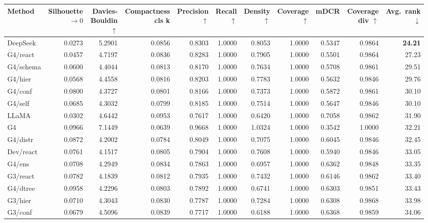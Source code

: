 \begin{table}[t]
\centering
\scriptsize
\setlength\tabcolsep{3pt}
\begin{tabular}{lrrrrrrrrrr}
\toprule
\textbf{Method} & \textbf{Silhouette} $\rightarrow 0$ & \textbf{Davies-Bouldin} $\uparrow$ & \textbf{Compactness cls k}  & \textbf{Precision} $\uparrow$ & \textbf{Recall} $\uparrow$ & \textbf{Density} $\uparrow$ & \textbf{Coverage} $\uparrow$ & \textbf{mDCR}  & \textbf{Coverage div} $\uparrow$ & \textbf{Avg.\ rank} $\downarrow$ \\
\midrule
DeepSeek & 0.0273 & 5.2901 & 0.0856 & 0.8303 & 1.0000 & 0.8053 & 1.0000 & 0.5347 & 0.9864 & \textbf{24.21} \\
\midrule
G4/react & 0.0457 & 4.7197 & 0.0836 & 0.8283 & 1.0000 & 0.7905 & 1.0000 & 0.5501 & 0.9864 & 27.23 \\
G4/schema & 0.0600 & 4.4044 & 0.0813 & 0.8170 & 1.0000 & 0.7634 & 1.0000 & 0.5708 & 0.9861 & 29.51 \\
G4/hier & 0.0568 & 4.4558 & 0.0816 & 0.8203 & 1.0000 & 0.7783 & 1.0000 & 0.5632 & 0.9846 & 29.76 \\
G4/conf & 0.0800 & 4.3727 & 0.0801 & 0.8166 & 1.0000 & 0.7373 & 1.0000 & 0.5872 & 0.9861 & 30.10 \\
G4/self & 0.0685 & 4.3032 & 0.0799 & 0.8185 & 1.0000 & 0.7514 & 1.0000 & 0.5647 & 0.9846 & 30.10 \\
\midrule
LLaMA & 0.0302 & 4.6442 & 0.0953 & 0.7617 & 1.0000 & 0.6420 & 1.0000 & 0.7058 & 0.9862 & 31.90 \\
\midrule
G4 & 0.0966 & 7.1449 & 0.0639 & 0.9668 & 1.0000 & 1.0324 & 1.0000 & 0.3542 & 1.0000 & 32.21 \\
G4/distr & 0.0872 & 4.2002 & 0.0784 & 0.8049 & 1.0000 & 0.7075 & 1.0000 & 0.6045 & 0.9846 & 32.45 \\
Dev/react & 0.0761 & 4.1517 & 0.0805 & 0.7904 & 1.0000 & 0.7608 & 1.0000 & 0.5940 & 0.9846 & 33.05 \\
G4/ens & 0.0708 & 4.2949 & 0.0834 & 0.7863 & 1.0000 & 0.6957 & 1.0000 & 0.6362 & 0.9848 & 33.35 \\
G3/react & 0.0782 & 4.1839 & 0.0812 & 0.7935 & 1.0000 & 0.7432 & 1.0000 & 0.6146 & 0.9862 & 33.40 \\
G4/dtree & 0.0958 & 4.2296 & 0.0803 & 0.7892 & 1.0000 & 0.6741 & 1.0000 & 0.6303 & 0.9851 & 33.43 \\
G3/hier & 0.0710 & 4.3043 & 0.0830 & 0.7787 & 1.0000 & 0.7284 & 1.0000 & 0.6308 & 0.9868 & 33.98 \\
G3/conf & 0.0679 & 4.5096 & 0.0839 & 0.7717 & 1.0000 & 0.6188 & 1.0000 & 0.6368 & 0.9859 & 34.06 \\

\end{tabular}
\end{table}

